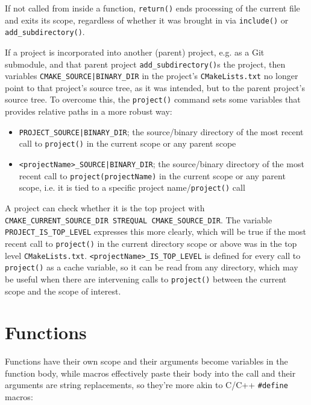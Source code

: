 \documentclass[8pt, table, xcdraw]{article}%
\begin{document}
If not called from inside a function, \lstinline{return()} ends processing of the current file and exits its scope, regardless of whether it was brought in via \lstinline{include()} or \lstinline{add_subdirectory()}.

If a project is incorporated into another (parent) project, e.g. as a Git submodule, and that parent project \lstinline{add_subdirectory()}s the project, then variables \lstinline{CMAKE_SOURCE|BINARY_DIR} in the project's \lstinline{CMakeLists.txt} no longer point to that project's source tree, as it was intended, but to the parent project's source tree. To overcome this, the \lstinline{project()} command sets some variables that provides relative paths in a more robust way:

\begin{itemize}
    \item \lstinline{PROJECT_SOURCE|BINARY_DIR}; the source/binary directory of the most recent call to \lstinline{project()} in the current scope or any parent scope
    \item \lstinline{<projectName>_SOURCE|BINARY_DIR}; the source/binary directory of the most recent call to \lstinline{project(projectName)} in the current scope or any parent scope, i.e. it is tied to a specific project name/\lstinline{project()} call
\end{itemize}

A project can check whether it is the top project with \lstinline{CMAKE_CURRENT_SOURCE_DIR STREQUAL CMAKE_SOURCE_DIR}. The variable \lstinline{PROJECT_IS_TOP_LEVEL} expresses this more clearly, which will be true if the most recent call to \lstinline{project()} in the current directory scope or above was in the top level \lstinline{CMakeLists.txt}. \lstinline{<projectName>_IS_TOP_LEVEL} is defined for every call to \lstinline{project()} as a cache variable, so it can be read from any directory, which may be useful when there are intervening calls to \lstinline{project()} between the current scope and the scope of interest.

\section{Functions}

Functions have their own scope and their arguments become variables in the function body, while macros effectively paste their body into the call and their arguments are string replacements, so they're more akin to C/C++ \lstinline{#define} macros:
\end{document}
